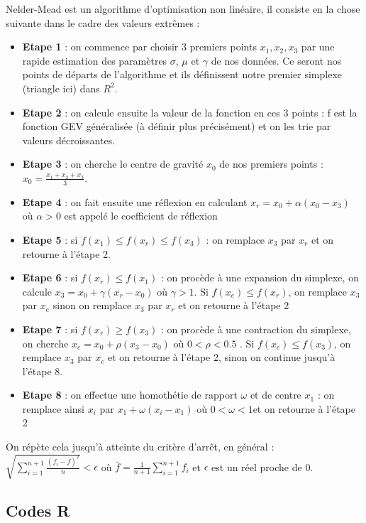 \documentclass{article}
\begin{document}
\noindent Nelder-Mead est un algorithme d'optimisation non linéaire, il consiste en la chose suivante dans le cadre des valeurs extrêmes : 
\begin{itemize}
	\item \textbf{Etape 1} : on commence par choisir 3 premiers points $x_1, x_2, x_3$ par une rapide estimation des paramètres $\sigma$, $\mu$ et $\gamma$ de nos données. Ce seront nos points de départs de l'algorithme et ils définissent notre premier simplexe (triangle ici) dans $R^2$.
	\item \textbf{Etape 2} : on calcule ensuite la valeur de la fonction en ces 3 points : f est la fonction GEV généralisée (à définir plus précisément) et on les trie par valeurs décroissantes.
	\item \textbf{Etape 3} : on cherche le centre de gravité $x_0$ de nos premiers points : $x_0 = \frac{x_1 + x_2 + x_3}{3}$.
	\item \textbf{Etape 4} : on fait ensuite une réflexion en calculant $x_r = x_0 + \alpha (x_0 - x_3)$ où $\alpha > 0$ est appelé le coefficient de réflexion
	\item \textbf{Etape 5} : si $f(x_1) \le  f(x_r) \le  f(x_3)$ : on remplace $x_3$ par $x_r$ et on retourne à l'étape 2.
	\item \textbf{Etape 6} : si $f(x_r) \le  f(x_1)$ : on procède à une expansion du simplexe, on calcule $x_3 = x_0 + \gamma(x_r - x_0)$ où $\gamma > 1$. Si $f(x_e) \le  f(x_r) $, on remplace $x_3$ par $x_e$ sinon on remplace $x_3$ par $x_r$ et on retourne à l'étape 2
	\item \textbf{Etape 7} : si $f(x_r) \geq f(x_3)$ : on procède à une contraction du simplexe, on cherche $x_c = x_0 + \rho(x_3 - x_0)$ où $0 < \rho < 0.5 $ . Si $f(x_c) \le  f(x_3)$, on remplace $x_3$ par $x_c$ et on retourne à l'étape 2, sinon on continue jusqu'à l'étape 8.
	\item \textbf{Etape 8} : on effectue une homothétie de rapport $\omega$ et de centre $x_1$ : on remplace ainsi $x_i$ par $x_1 + \omega(x_i - x_1)$ où $0 < \omega < 1$et on retourne à l'étape 2
\end{itemize}

\noindent On répète cela jusqu'à atteinte du critère d'arrêt, en général : $ \sqrt{\sum_{i=1}^{n+1}  \frac{(f_i - \bar{f})^2}{n}} < \epsilon $ où $\bar{f} =\frac{1}{n+1} \sum_{i=1}^{n+1} f_i $ et $ \epsilon $ est un réel proche de 0. \\


\subsection{Codes R}
\end{document}
